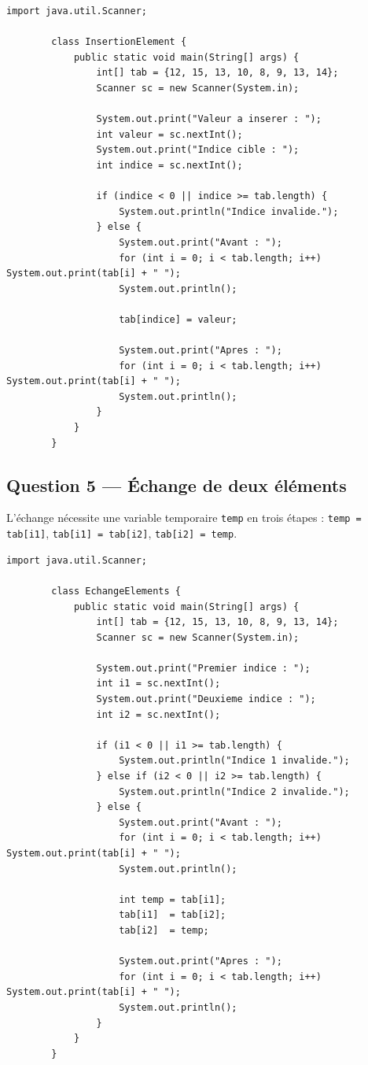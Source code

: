 \documentclass[12pt,a4paper]{article}
\begin{document}
	\begin{lstlisting}[style=java, caption={Q4 — Insertion avec vérification d'indice}]
		import java.util.Scanner;
		
		class InsertionElement {
			public static void main(String[] args) {
				int[] tab = {12, 15, 13, 10, 8, 9, 13, 14};
				Scanner sc = new Scanner(System.in);
				
				System.out.print("Valeur a inserer : ");
				int valeur = sc.nextInt();
				System.out.print("Indice cible : ");
				int indice = sc.nextInt();
				
				if (indice < 0 || indice >= tab.length) {
					System.out.println("Indice invalide.");
				} else {
					System.out.print("Avant : ");
					for (int i = 0; i < tab.length; i++) System.out.print(tab[i] + " ");
					System.out.println();
					
					tab[indice] = valeur;
					
					System.out.print("Apres : ");
					for (int i = 0; i < tab.length; i++) System.out.print(tab[i] + " ");
					System.out.println();
				}
			}
		}
	\end{lstlisting}
	
	\subsection*{Question 5 — Échange de deux éléments}
	
	\begin{boiteRaisonnement}
		L'échange nécessite une variable temporaire \texttt{temp} en trois étapes :
		\texttt{temp = tab[i1]}, \texttt{tab[i1] = tab[i2]}, \texttt{tab[i2] = temp}.
	\end{boiteRaisonnement}
	
	\begin{lstlisting}[style=java, caption={Q5 — Échange de deux cases}]
		import java.util.Scanner;
		
		class EchangeElements {
			public static void main(String[] args) {
				int[] tab = {12, 15, 13, 10, 8, 9, 13, 14};
				Scanner sc = new Scanner(System.in);
				
				System.out.print("Premier indice : ");
				int i1 = sc.nextInt();
				System.out.print("Deuxieme indice : ");
				int i2 = sc.nextInt();
				
				if (i1 < 0 || i1 >= tab.length) {
					System.out.println("Indice 1 invalide.");
				} else if (i2 < 0 || i2 >= tab.length) {
					System.out.println("Indice 2 invalide.");
				} else {
					System.out.print("Avant : ");
					for (int i = 0; i < tab.length; i++) System.out.print(tab[i] + " ");
					System.out.println();
					
					int temp = tab[i1];
					tab[i1]  = tab[i2];
					tab[i2]  = temp;
					
					System.out.print("Apres : ");
					for (int i = 0; i < tab.length; i++) System.out.print(tab[i] + " ");
					System.out.println();
				}
			}
		}
	\end{lstlisting}
	
\end{document}

